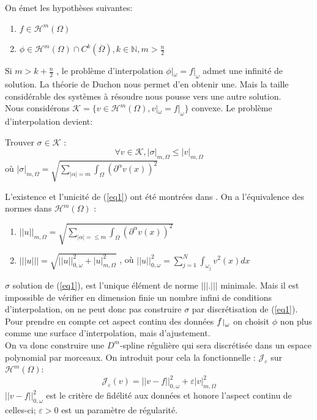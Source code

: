 \documentclass[final]{beamer}
\def\restriction#1#2{\mathchoice
              {\setbox1\hbox{${\displaystyle #1}_{\scriptstyle #2}$}
              \restrictionaux{#1}{#2}}
              {\setbox1\hbox{${\textstyle #1}_{\scriptstyle #2}$}
              \restrictionaux{#1}{#2}}
              {\setbox1\hbox{${\scriptstyle #1}_{\scriptscriptstyle #2}$}
              \restrictionaux{#1}{#2}}
              {\setbox1\hbox{${\scriptscriptstyle #1}_{\scriptscriptstyle #2}$}
              \restrictionaux{#1}{#2}}}
\def\restrictionaux#1#2{{#1\,\smash{\vrule height .8\ht1 depth .85\dp1}}_{\,#2}}
\newlength{\onecolwid}
\newlength{\twocolwid}
\begin{document}
\begin{frame}[t]
\begin{columns}[t]
\begin{column}{\twocolwid}
\begin{columns}[t,totalwidth=\twocolwid]
\begin{column}{\onecolwid}
\begin{block}{}
On émet les hypothèses suivantes:
\begin{enumerate}
\item $f \in \mathcal{H}^m(\Omega)$
\item $\phi \in \mathcal{H}^m(\Omega) \cap C^k(\overline{\Omega}) , k \in \mathbb{N} , m > \frac{n}{2}$
\end{enumerate}

Si $m>k+\frac{n}{2}$ , le problème d'interpolation $\phi|_{\omega}=f|_{\omega}$ admet une infinité de solution. La théorie de Duchon \cite{Duchon76} nous permet d'en obtenir une. Mais la taille considérable des systèmes à résoudre nous pousse vers une autre solution.\\

Nous considérons $\mathcal{K}=\{v\in\mathcal{H}^m(\Omega),v|_{\omega}=f|_{\omega}\}$ convexe. Le problème d'interpolation devient:
\begin{center}
Trouver $\sigma \in \mathcal{K}$ : 
\begin{equation}
\forall v \in \mathcal{K} , |\sigma|_{m,\Omega} \leq |v|_{m,\Omega}
\label{eq1}
\end{equation}
où $|\sigma|_{m,\Omega} = \sqrt{\sum_{|\alpha|=m}{\int_{\Omega}{(\partial^{\alpha}{v(x)})^2}}}$
\end{center}

L'existence et l'unicité de (\ref{eq1}) ont été montrées dans \cite{gout97etude}. On a l'équivalence des normes dans $\mathcal{H}^m(\Omega)$ :
\begin{enumerate} 
\item $||u||_{m,\Omega} = \sqrt{\sum_{|\alpha|=\leq m}{\int_{\Omega}{(\partial^{\alpha}{v(x)})^2}}}$
\item  $|||u|||=\sqrt{||u||^2_{0,\omega} + |u|_{m,\Omega}^2}$ , où $||u||^2_{0,\omega}= \sum_{j=1}^{N}{\int_{\omega_j}{v^2(x)dx}}$ 
\end{enumerate}

$\sigma$ solution de (\ref{eq1}), est l'unique élément de norme $|||.|||$ minimale. Mais il est impossible de vérifier en dimension finie 
un nombre infini de conditions d'interpolation, on ne peut donc pas construire $\sigma$ par discrétisation de (\ref{eq1}). Pour prendre en compte cet aspect continu des données $\restriction{f}{\omega}$ on choisit $\phi$ non plus comme une surface d'interpolation, mais d'ajustement.\\

On va donc construire une $D^m$-spline régulière \cite{arcang89Applic} qui sera discrétisée dans un espace polynomial par morceaux. On introduit pour cela la fonctionnelle : $\mathcal{J}_{\varepsilon}$ sur $\mathcal{H}^m(\Omega)$:
\[ \mathcal{J}_{\varepsilon}(v) = ||v-f||_{0,\omega}^2 + \varepsilon|v|^2_{m,\Omega} \]
$ ||v-f||_{0,\omega}^2 $ est le critère de fidélité aux données et honore l'aspect continu de celles-ci; $\varepsilon > 0 $ est un paramètre de régularité.\\


\end{block}
\end{column}
\end{columns}
\end{column}
\end{columns}
\end{frame}
\end{document}
